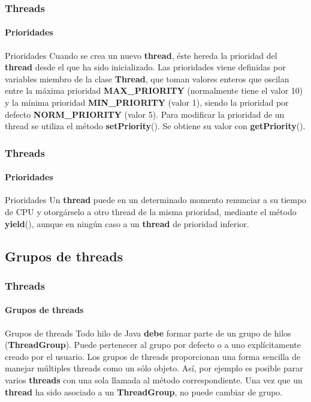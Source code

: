 \documentclass{beamer}
\begin{document}
    \begin{frame}
		\frametitle{Threads}
		\framesubtitle{Prioridades}

        \begin{block}{Prioridades} 
            Cuando se crea un nuevo \textbf{thread}, \'este hereda la prioridad del \textbf{thread} desde el que ha sido inicializado. Las prioridades viene definidas por variables miembro de la clase \textbf{Thread}, que toman valores enteros que oscilan entre la m\'axima prioridad \textbf{MAX\_PRIORITY} (normalmente tiene el valor 10) y la m\'inima prioridad \textbf{MIN\_PRIORITY} (valor 1), siendo la prioridad por defecto \textbf{NORM\_PRIORITY} (valor 5). Para modificar la prioridad de un thread se utiliza el m\'etodo \textbf{setPriority}(). Se obtiene su valor con \textbf{getPriority}().
        \end{block}
	\end{frame}

    \begin{frame}
		\frametitle{Threads}
		\framesubtitle{Prioridades}

        \begin{block}{Prioridades} 
            Un \textbf{thread} puede en un determinado momento renunciar a su tiempo de CPU y otorg\'arselo a otro thread de la misma prioridad, mediante el m\'etodo \textbf{yield}(), aunque en ning\'un caso a un \textbf{thread} de prioridad inferior.
        \end{block}
	\end{frame}

    \subsection{Grupos de threads}

    \begin{frame}
		\frametitle{Threads}
		\framesubtitle{Grupos de threads}

        \begin{block}{Grupos de threads} 
            Todo hilo de Java \textbf{debe} formar parte de un grupo de hilos (\textbf{ThreadGroup}). Puede pertenecer al grupo por defecto o a uno expl\'icitamente creado por el usuario. Los grupos de threads proporcionan una forma sencilla de manejar m\'ultiples threads como un s\'olo objeto. As\'i, por ejemplo es posible parar varios \textbf{threads} con una sola llamada al m\'etodo
correspondiente. Una vez que un \textbf{thread} ha sido asociado a un \textbf{ThreadGroup}, no puede cambiar de grupo.
        \end{block}
	\end{frame}
\end{document}
